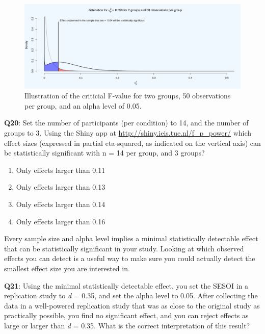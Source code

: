 \documentclass[
  oneside]{book}
\providecommand{\tightlist}{%
  \setlength{\itemsep}{0pt}\setlength{\parskip}{0pt}}
\begin{document}
\begin{figure}

{\centering \includegraphics[width=1\linewidth]{images/7f6d17dc07bdc9e95ea8944d78b16d7c} 

}

\caption{Illustration of the criticial F-value for two groups, 50 observations per group, and an alpha level of 0.05.}\label{fig:critf}
\end{figure}

\textbf{Q20}: Set the number of participants (per condition) to 14, and the number of groups to 3. Using the Shiny app at \url{http://shiny.ieis.tue.nl/f_p_power/} which effect sizes (expressed in partial eta-squared, as indicated on the vertical axis) can be statistically significant with n = 14 per group, and 3 groups?

\begin{enumerate}
\def\labelenumi{\Alph{enumi})}
\tightlist
\item
  Only effects larger than 0.11
\item
  Only effects larger than 0.13
\item
  Only effects larger than 0.14
\item
  Only effects larger than 0.16
\end{enumerate}

Every sample size and alpha level implies a minimal statistically detectable effect that can be statistically significant in your study. Looking at which observed effects you can detect is a useful way to make sure you could actually detect the smallest
effect size you are interested in.

\textbf{Q21}: Using the minimal statistically detectable effect, you set the SESOI in a replication study to \emph{d} = 0.35, and set the alpha level to 0.05. After collecting the data in a well-powered replication study that was as close to the original study as practically possible, you find no significant effect, and you can reject effects as large or larger than \emph{d} = 0.35. What is the correct interpretation of this result?
\end{document}
